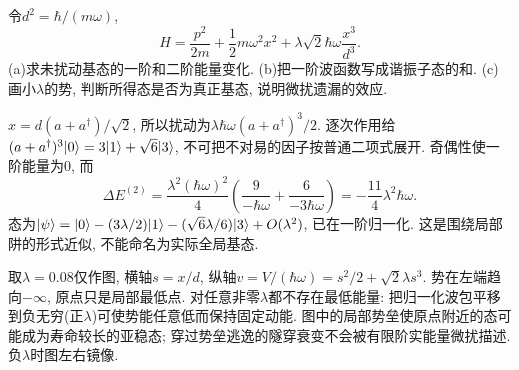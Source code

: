 \begin{exercise}
令$d^2=\hbar/(m\omega)$,
\[
H=\frac{p^2}{2m}+\frac12m\omega^2x^2+\lambda\sqrt2\hbar\omega\frac{x^3}{d^3}.
\]
(a)求未扰动基态的一阶和二阶能量变化. (b)把一阶波函数写成谐振子态的和. (c)画小$\lambda$的势, 判断所得态是否为真正基态, 说明微扰遗漏的效应.
\end{exercise}
\begin{solution}
$x=d(a+a^\dagger)/\sqrt2$, 所以扰动为$\lambda\hbar\omega(a+a^\dagger)^3/2$. 逐次作用给$(a+a^\dagger)^3\lvert 0\rangle=3\lvert 1\rangle+\sqrt6\lvert 3\rangle$, 不可把不对易的因子按普通二项式展开. 奇偶性使一阶能量为0, 而
\[
\Delta E^{(2)}=\frac{\lambda^2(\hbar\omega)^2}{4}
\left(\frac9{-\hbar\omega}+\frac6{-3\hbar\omega}\right)
=-\frac{11}{4}\lambda^2\hbar\omega.
\]
态为$\lvert \psi\rangle=\lvert 0\rangle-(3\lambda/2)\lvert 1\rangle-(\sqrt6\lambda/6)\lvert 3\rangle+O(\lambda^2)$, 已在一阶归一化. 这是围绕局部阱的形式近似, 不能命名为实际全局基态.

取$\lambda=0.08$仅作图, 横轴$s=x/d$, 纵轴$v=V/(\hbar\omega)=s^2/2+\sqrt2\lambda s^3$. 势在左端趋向$-\infty$, 原点只是局部最低点. 对任意非零$\lambda$都不存在最低能量: 把归一化波包平移到负无穷(正$\lambda$)可使势能任意低而保持固定动能. 图中的局部势垒使原点附近的态可能成为寿命较长的亚稳态; 穿过势垒逃逸的隧穿衰变不会被有限阶实能量微扰描述. 负$\lambda$时图左右镜像.
\begin{center}\end{center}
\end{solution}

